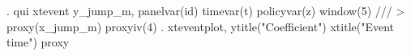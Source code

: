 . qui xtevent y_jump_m, panelvar(id) timevar(t) policyvar(z) window(5) ///
> proxy(x_jump_m) proxyiv(4)
{\smallskip}
. xteventplot, ytitle("Coefficient") xtitle("Event time") proxy
